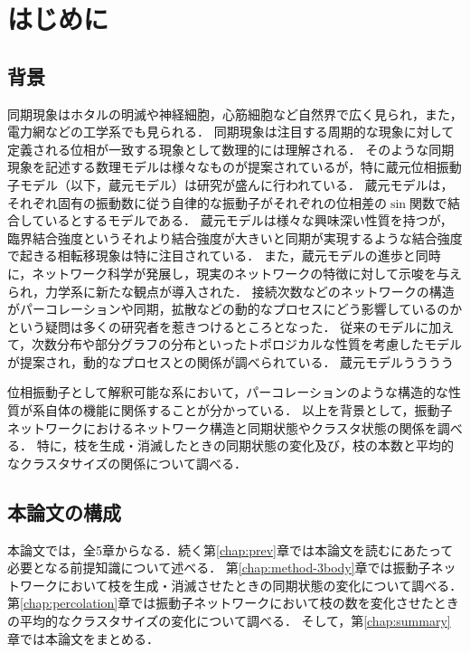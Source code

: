 \documentclass[../main]{subfiles}
\begin{document}
\chapter{はじめに}
\section{背景}
\label{chap:intro-back}
同期現象はホタルの明滅や神経細胞，心筋細胞など自然界で広く見られ，また，電力網などの工学系でも見られる．
同期現象は注目する周期的な現象に対して定義される位相が一致する現象として数理的には理解される．
そのような同期現象を記述する数理モデルは様々なものが提案されているが，特に蔵元位相振動子モデル（以下，蔵元モデル）は研究が盛んに行われている．
蔵元モデルは，それぞれ固有の振動数に従う自律的な振動子がそれぞれの位相差の$\sin$関数で結合しているとするモデルである．
蔵元モデルは様々な興味深い性質を持つが，臨界結合強度というそれより結合強度が大きいと同期が実現するような結合強度で起きる相転移現象は特に注目されている．
また，蔵元モデルの進歩と同時に，ネットワーク科学が発展し，現実のネットワークの特徴に対して示唆を与えられ，力学系に新たな観点が導入された．
接続次数などのネットワークの構造がパーコレーションや同期，拡散などの動的なプロセスにどう影響しているのかという疑問は多くの研究者を惹きつけるところとなった．
従来のモデルに加えて，次数分布や部分グラフの分布といったトポロジカルな性質を考慮したモデルが提案され，動的なプロセスとの関係が調べられている．
蔵元モデルうううう\cite{RODRIGUES20161}

位相振動子として解釈可能な系において，パーコレーションのような構造的な性質が系自体の機能に関係することが分かっている．
以上を背景として，振動子ネットワークにおけるネットワーク構造と同期状態やクラスタ状態の関係を調べる．
特に，枝を生成・消滅したときの同期状態の変化及び，枝の本数と平均的なクラスタサイズの関係について調べる．
\section{本論文の構成}
\label{chap:intro-config}
本論文では，全5章からなる．続く第\ref{chap:prev}章では本論文を読むにあたって必要となる前提知識について述べる．
第\ref{chap:method-3body}章では振動子ネットワークにおいて枝を生成・消滅させたときの同期状態の変化について調べる．
第\ref{chap:percolation}章では振動子ネットワークにおいて枝の数を変化させたときの平均的なクラスタサイズの変化について調べる．
そして，第\ref{chap:summary}章では本論文をまとめる．
\end{document}
